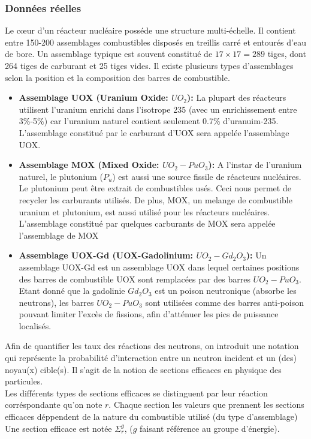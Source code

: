 \subsubsection{Données réelles}
Le cœur d'un réacteur nucléaire posséde une structure multi-échelle. Il contient entre 150-200 assemblages combustibles disposés en treillis carré
et entourés d'eau de bore. Un assemblage typique est souvent constitué de $17 \times 17=289$ tiges, dont 264 tiges de carburant et 25 tiges vides.
Il existe plusieurs types d'assemblages selon la position et la composition des barres de combustible.
\begin{itemize}
\item \textbf{Assemblage UOX (Uranium Oxide: $UO_2$):}
La plupart des réacteurs utilisent l'uranium enrichi dans l'isotrope 235 (avec un enrichissement entre 3\%-5\%) car l'uranium naturel contient seulement 0.7\% d'uranuim-235.
L'assemblage constitué par le carburant d'UOX sera appelée l'assemblage UOX.

\item \textbf{Assemblage MOX (Mixed Oxide: $UO_2-PuO_3$):}
A l'instar de l'uranium naturel, le plutonium ($P_u$) est aussi une source fissile de réacteurs nucléaires.
Le plutonium peut être extrait de combustibles usés. Ceci nous permet de recycler les carburants utilisés.
De plus, MOX, un melange de combustible uranium et plutonium, est aussi utilisé pour les réacteurs nucléaires.
L'assemblage constitué par quelques carburants de MOX sera appelée l'assemblage de MOX

\item \textbf{Assemblage UOX-Gd (UOX-Gadolinium: $UO_2-Gd_2O_3$):}
Un assemblage UOX-Gd est un assemblage UOX dans lequel certaines positions des barres de combustible UOX sont remplacées par des barres $UO_2-PuO_3$.
Etant donné que la gadolinie $Gd_2O_3$ est un poison neutronique (absorbe les neutrons), les barres $UO_2-PuO_3$ sont utilisées comme des barres anti-poison
pouvant limiter l'excès de fissions, afin d'atténuer les pics de puissance localisés.
\end{itemize}

\vspace{0.5cm}
\hspace{0.5cm}
Afin de quantifier les taux des réactions des neutrons, on introduit une notation qui représente la probabilité d'interaction entre un neutron incident et un (des) noyau(x) cible(s).
Il s'agit de la notion de sections efficaces en physique des particules.\\
Les différents types de sections efficaces se distinguent par leur réaction corréspondante qu'on note $r$.
Chaque section les valeurs que prennent les sections efficaces déppendent de la nature du combustible utilisé (du type d'assemblage)
Une section efficace est notée $\Sigma_r^g$, ($g$ faisant référence au groupe d'énergie).\\

